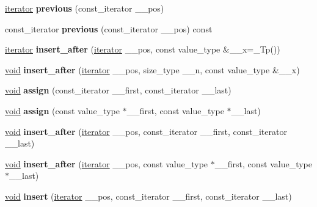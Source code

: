 \begin{DoxyCompactItemize}
\hyperlink{structiterator}{iterator} {\bfseries previous} (const\+\_\+iterator \+\_\+\+\_\+pos)
\item 
\mbox{\label{classslist_af4ed2e438e231f0750e84f29b943d7a6}} 
const\+\_\+iterator {\bfseries previous} (const\+\_\+iterator \+\_\+\+\_\+pos) const
\item 
\mbox{\label{classslist_a6457067f54e6e85cc5aed6662f2ee2a9}} 
\hyperlink{structiterator}{iterator} {\bfseries insert\+\_\+after} (\hyperlink{structiterator}{iterator} \+\_\+\+\_\+pos, const value\+\_\+type \&\+\_\+\+\_\+x=\+\_\+\+Tp())
\item 
\mbox{\label{classslist_aa98831e0d2cbbc18559a4aa76bee1c1e}} 
\hyperlink{interfacevoid}{void} {\bfseries insert\+\_\+after} (\hyperlink{structiterator}{iterator} \+\_\+\+\_\+pos, size\+\_\+type \+\_\+\+\_\+n, const value\+\_\+type \&\+\_\+\+\_\+x)
\item 
\mbox{\label{classslist_aa2d9bf7cc0cb5d03de338e88b4e0e0e1}} 
\hyperlink{interfacevoid}{void} {\bfseries assign} (const\+\_\+iterator \+\_\+\+\_\+first, const\+\_\+iterator \+\_\+\+\_\+last)
\item 
\mbox{\label{classslist_a520718d96a39c772e29b27bc9ae7709e}} 
\hyperlink{interfacevoid}{void} {\bfseries assign} (const value\+\_\+type $\ast$\+\_\+\+\_\+first, const value\+\_\+type $\ast$\+\_\+\+\_\+last)
\item 
\mbox{\label{classslist_ac48f0ea37816ca850d418cd17400c275}} 
\hyperlink{interfacevoid}{void} {\bfseries insert\+\_\+after} (\hyperlink{structiterator}{iterator} \+\_\+\+\_\+pos, const\+\_\+iterator \+\_\+\+\_\+first, const\+\_\+iterator \+\_\+\+\_\+last)
\item 
\mbox{\label{classslist_a5ec7ba3a0ba98e46ffea1f26fa6b7120}} 
\hyperlink{interfacevoid}{void} {\bfseries insert\+\_\+after} (\hyperlink{structiterator}{iterator} \+\_\+\+\_\+pos, const value\+\_\+type $\ast$\+\_\+\+\_\+first, const value\+\_\+type $\ast$\+\_\+\+\_\+last)
\item 
\mbox{\label{classslist_a0afd5a869869cd7062ec22f805b9d63f}} 
\hyperlink{interfacevoid}{void} {\bfseries insert} (\hyperlink{structiterator}{iterator} \+\_\+\+\_\+pos, const\+\_\+iterator \+\_\+\+\_\+first, const\+\_\+iterator \+\_\+\+\_\+last)

\end{DoxyCompactItemize}
